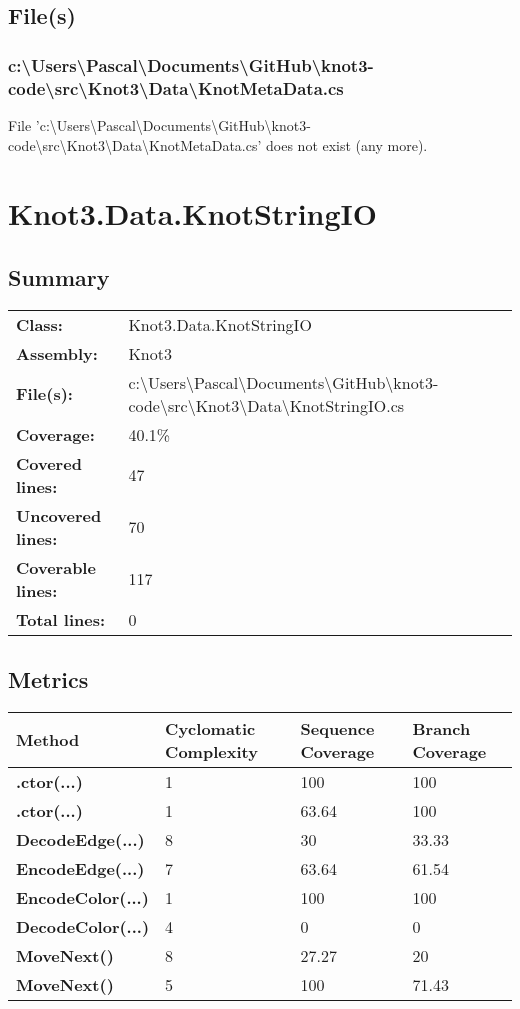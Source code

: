 \documentclass[a4paper,10pt]{article}
\begin{document}
\subsection{File(s)}
\subsubsection{c:\textbackslash Users\textbackslash Pascal\textbackslash Documents\textbackslash GitHub\textbackslash knot3-code\textbackslash src\textbackslash Knot3\textbackslash Data\textbackslash KnotMetaData.cs}
 File 'c:\textbackslash Users\textbackslash Pascal\textbackslash Documents\textbackslash GitHub\textbackslash knot3-code\textbackslash src\textbackslash Knot3\textbackslash Data\textbackslash KnotMetaData.cs' does not exist (any more).
\newpage
\section{Knot3.Data.KnotStringIO}
\subsection{Summary}
\begin{longtable}[l]{ll}
\textbf{Class:} & Knot3.Data.KnotStringIO\\
\textbf{Assembly:} & Knot3\\
\textbf{File(s):} & \begin{minipage}[t]{12cm}{c:\textbackslash Users\textbackslash Pascal\textbackslash Documents\textbackslash GitHub\textbackslash knot3-code\textbackslash src\textbackslash Knot3\textbackslash Data\textbackslash KnotStringIO.cs}\end{minipage} \\
\textbf{Coverage:} & 40.1\%\\
\textbf{Covered lines:} & 47\\
\textbf{Uncovered lines:} & 70\\
\textbf{Coverable lines:} & 117\\
\textbf{Total lines:} & 0\\
\end{longtable}
\subsection{Metrics}
\begin{longtable}[l]{|l|l|l|l|}
\hline
\textbf{Method} & \textbf{Cyclomatic Complexity} & \textbf{Sequence Coverage} & \textbf{Branch Coverage}\\
\hline
\textbf{.ctor(...)} & 1 & 100 & 100\\
\hline
\textbf{.ctor(...)} & 1 & 63.64 & 100\\
\hline
\textbf{DecodeEdge(...)} & 8 & 30 & 33.33\\
\hline
\textbf{EncodeEdge(...)} & 7 & 63.64 & 61.54\\
\hline
\textbf{EncodeColor(...)} & 1 & 100 & 100\\
\hline
\textbf{DecodeColor(...)} & 4 & 0 & 0\\
\hline
\textbf{MoveNext()} & 8 & 27.27 & 20\\
\hline
\textbf{MoveNext()} & 5 & 100 & 71.43\\
\hline
\end{longtable}
\end{document}
